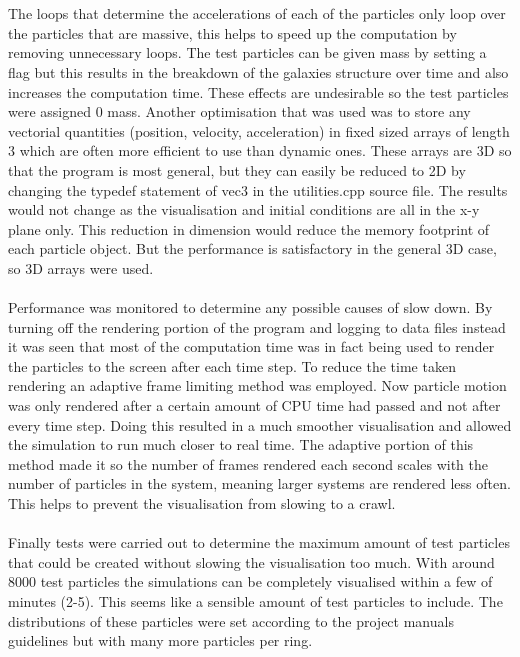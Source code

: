 \documentclass[10pt,a4paper]{article}
\begin{document}
\\
\\
The loops that determine the accelerations of each of the particles only loop over the particles that are massive, this helps to speed up the computation by removing unnecessary loops. The test particles can be given mass by setting a flag but this results in the breakdown of the galaxies structure over time and also increases the computation time. These effects are undesirable so the test particles were assigned 0 mass. Another optimisation that was used was to store any vectorial quantities (position, velocity, acceleration) in fixed sized arrays of length 3 which are often more efficient to use than dynamic ones. These arrays are 3D so that the program is most general, but they can easily be reduced to 2D by changing the typedef statement of vec3 in the utilities.cpp source file. The results would not change as the visualisation and initial conditions are all in the x-y plane only. This reduction in dimension would reduce the memory footprint of each particle object. But the performance is satisfactory in the general 3D case, so 3D arrays were used.
\\
\\
Performance was monitored to determine any possible causes of slow down. By turning off the rendering portion of the program and logging to data files instead it was seen that most of the computation time was in fact being used to render the particles to the screen after each time step. To reduce the time taken rendering an adaptive frame limiting method was employed. Now particle motion was only rendered after a certain amount of CPU time had passed and not after every time step. Doing this resulted in a much smoother visualisation and allowed the simulation to run much closer to real time. The adaptive portion of this method made it so the number of frames rendered each second scales with the number of particles in the system, meaning larger systems are rendered less often. This helps to prevent the visualisation from slowing to a crawl.
\\
\\
Finally tests were carried out to determine the maximum amount of test particles that could be created without slowing the visualisation too much. With around 8000 test particles the simulations can be completely visualised within a few of minutes (2-5). This seems like a sensible amount of test particles to include. The distributions of these particles were set according to the project manuals guidelines but with many more particles per ring.
\end{document}
